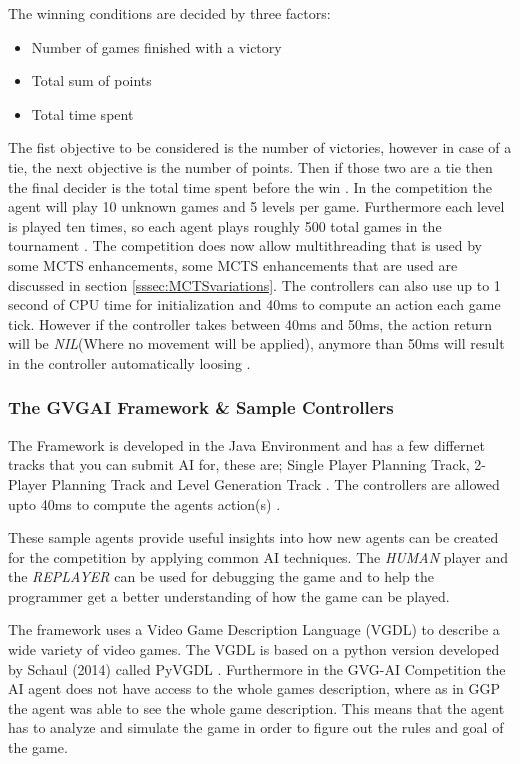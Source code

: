 \documentclass[journal]{IEEEtran}
\begin{document}
		The winning conditions are decided by three factors:
		\begin{itemize}
		    \item Number of games finished with a victory
		    \item Total sum of points
		    \item Total time spent
		\end{itemize}
		The fist objective to be considered is the number of victories, however in case of a tie, the next objective is the number of points. Then if those two are a tie then the final decider is the total time spent before the win \cite{perez20162014}.
		In the competition the agent will play 10 unknown games and 5 levels per game. Furthermore each level is played ten times, so each agent plays roughly 500 total games in the tournament \cite{schuster2015mcts}.
		The competition does now allow multithreading that is used by some MCTS enhancements, some MCTS enhancements that are used are discussed in section \ref{sssec:MCTSvariations}.
		The controllers can also use up to 1 second of CPU time for initialization and 40ms to compute an action each game tick. However if the controller takes between 40ms and 50ms, the action return will be \textit{NIL}(Where no movement will be applied), anymore than 50ms will result in the controller automatically loosing \cite{horn2016mcts, perez20162014}.
	
	
	\subsubsection{The GVGAI Framework \& Sample Controllers}
		The Framework is developed in the Java Environment and has a few differnet tracks that you can submit AI for, these are; Single Player Planning Track, 2-Player Planning Track and Level Generation Track \cite{gaina2016general}.
		The controllers are allowed upto 40ms to compute the agents action(s) \cite{perez2016GVGAICompetition, GVGAI}.
		
		
		These sample agents provide useful insights into how new agents can be created for the competition by applying common AI techniques.
		The \textit{HUMAN} player and the \textit{REPLAYER} can be used for debugging the game and to help the programmer get a better understanding of how the game can be played.
		
		
		The framework uses a Video Game Description Language (VGDL) to describe a wide variety of video games. The VGDL is based on a python version developed by Schaul (2014) called PyVGDL \cite{schuster2015mcts}. Furthermore in the GVG-AI Competition the AI agent does not have access to the whole games description, where as in GGP the agent was able to see the whole game description. This means that the agent has to analyze and simulate the game in order to figure out the rules and goal of the game.
		
\end{document}
